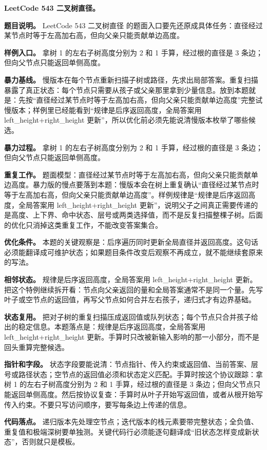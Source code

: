 \noindent\textbf{LeetCode 543 二叉树直径。}

\textbf{题目说明。} LeetCode 543 二叉树直径 的题面入口要先还原成具体任务：直径经过某节点时等于左高加右高，但向父亲只能贡献单边高度。

\textbf{样例入口。} 拿树 1 的左右子树高度分别为 2 和 1 手算，经过根的直径是 3 条边；但向父节点只能返回单侧高度。

\textbf{暴力基线。} 慢版本在每个节点重新扫描子树或路径，先求出局部答案。重复扫描暴露了真正状态：每个节点只需要从孩子或父亲那里拿到少量信息。放到本题就是：先按“直径经过某节点时等于左高加右高，但向父亲只能贡献单边高度”完整试慢版本；样例里已经能看到“规律是后序返回高度，全局答案用 left\_height+right\_height 更新”，所以优化前必须先能说清慢版本枚举了哪些候选。

\textbf{暴力过程。} 拿树 1 的左右子树高度分别为 2 和 1 手算，经过根的直径是 3 条边；但向父节点只能返回单侧高度。

\textbf{重复工作。} 题面模型：直径经过某节点时等于左高加右高，但向父亲只能贡献单边高度。暴力版的慢点要落到本题：慢版本会在树上重复确认“直径经过某节点时等于左高加右高，但向父亲只能贡献单边高度”。样例规律是“规律是后序返回高度，全局答案用 left\_height+right\_height 更新”，说明父子之间真正需要传递的是高度、上下界、命中状态、层号或两类选择值，而不是反复扫描整棵子树。后面的优化只消掉这类重复工作，不能改变答案集合。

\textbf{优化条件。} 本题的关键观察是：后序遍历同时更新全局直径并返回高度。这句话必须能翻译成可维护状态；如果题目条件改变后观察不再成立，就不能继续套原来的写法。

\textbf{相邻状态。} 规律是后序返回高度，全局答案用 left\_height+right\_height 更新。把这个特例继续拆开看：节点向父亲返回的量和全局答案通常不是同一个量。先写叶子或空节点的返回值，再写父节点如何合并左右孩子，递归式才有边界基础。

\textbf{状态复用。} 把对子树的重复扫描压成返回值或队列状态；每个节点只合并孩子给出的稳定信息。本题落点是：规律是后序返回高度，全局答案用 left\_height+right\_height 更新。手算时只改被新输入影响的那一小部分，而不是回头重算完整候选。

\textbf{指针和字段。} 状态字段要能说清：节点指针、传入约束或返回值、当前答案、层号或路径状态；空节点的返回值必须和状态定义匹配。手算时按这个协议跟踪：拿树 1 的左右子树高度分别为 2 和 1 手算，经过根的直径是 3 条边；但向父节点只能返回单侧高度。然后按协议复查：手算时从叶子开始写返回值，或者从根开始写传入约束。不要只写访问顺序，要写每条边上传递的信息。

\textbf{代码落点。} 递归版本先处理空节点；迭代版本的栈元素要带完整状态；全负值、重复值和极端深树要单独测。关键代码行必须能逐句翻译成“旧状态怎样变成新状态”，否则就只是模板。

